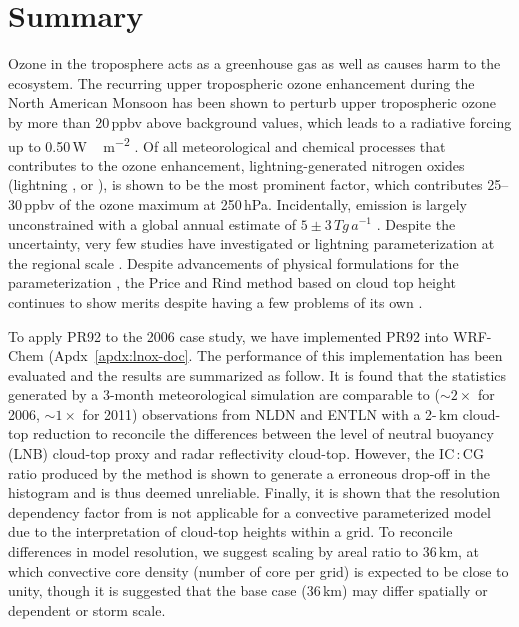 \chapter{Summary} \label{ch:summary}

\ifpdf
    \graphicspath{{5_summary/figures/PNG/}{5_summary/figures/PDF/}{5_summary/figures/}}
\else
    \graphicspath{{5_summary/figures/EPS/}{5_summary/figures/}}
\fi

Ozone in the troposphere acts as a greenhouse gas as well as causes harm to the ecosystem.
The recurring upper tropospheric ozone enhancement during the North American Monsoon has
been shown to perturb upper tropospheric ozone by more than 20\,\unit{ppbv} above background values,
which leads to a radiative forcing up to 0.50\,\unit{W\,m^{-2}} \citep{Li:2005ss,Cooper:2007cr,Choi:2009bh}.
Of all meteorological and chemical processes that contributes to the ozone enhancement,
lightning-generated nitrogen oxides (lightning , or {\lnox}), is shown to be the most
prominent factor, which contributes 25--30\,\unit{ppbv} of the ozone maximum at
250\,\unit{hPa}\citep{Cooper:2007cr}. Incidentally, {\lnox} emission is largely unconstrained
with a global annual estimate of $5\pm3\,\unit{Tg\,a^{-1}}$ \citep{Schumann:2007fk}. Despite the
uncertainty, very few studies have investigated {\lnox} or lightning parameterization at the regional scale
\citep[e.g.][]{Allen:2010fk,Allen:2012fk,Barth:2012qf,Wong:2013vn}. Despite advancements of
physical formulations for the parameterization \citep[][and references therein]{Barthe:2010uq},
the Price and Rind \citep[PR92;][]{Price:1992wb} method based on cloud top height continues to show
merits despite having a few problems of its own \citep{Boccippio:2002uq}.

To apply PR92 to the 2006 case study, we have implemented PR92 into WRF-Chem
(Apdx~\ref{apdx:lnox-doc}. The performance of this implementation has been evaluated
\citep[][, Ch.~\ref{ch:lightning}]{Wong:2013vn} and the results are summarized as follow. It is
found that the statistics generated by a 3-month meteorological simulation are
comparable to ($\sim2\times$ for 2006, $\sim1\times$ for 2011) observations from NLDN and
ENTLN with a 2-\,\unit{km} cloud-top reduction to reconcile the differences between the level
of neutral buoyancy (LNB) cloud-top proxy and radar reflectivity cloud-top. However, the
IC\,:\,CG ratio produced by the \citet[][PR93]{Price:1993fk} method is shown to generate a erroneous
drop-off in the histogram and is thus deemed unreliable. Finally, it is shown that the resolution
dependency factor from \citet[][PR94]{Price:1994fk} is not applicable for a convective parameterized
model due to the interpretation of cloud-top heights within a grid. To reconcile differences
in model resolution, we suggest scaling by areal ratio to 36\,\unit{km}, at which convective
core density (number of core per grid) is expected to be close to unity, though it is suggested
that the base case (36\,\unit{km}) may differ spatially or dependent or storm scale.

